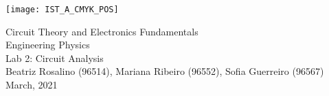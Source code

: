 
\thispagestyle {empty}

\texttt{[image: IST\_A\_CMYK\_POS]}

\begin{center}
%
\vspace{1.0cm}

\vspace{1cm}
{\FontLb Circuit Theory and Electronics Fundamentals} \\ %
\vspace{1cm}
{\FontSn Engineering Physics} \\ %
\vspace{1cm}
{\FontSn Lab 2: Circuit Analysis} \\
\vspace{1cm}
{\FontSn Beatriz Rosalino (96514), Mariana Ribeiro (96552), Sofia Guerreiro (96567)} \\
\vspace{1cm}
{ March, 2021} \\ %
%
\end{center}

